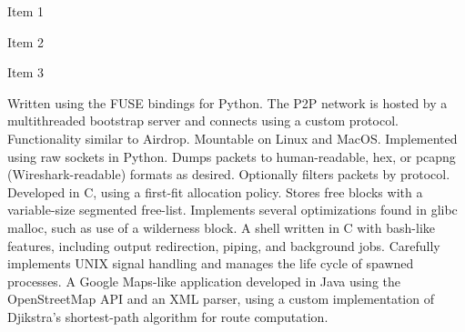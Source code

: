 \documentclass{cv}
\begin{document}
\begin{entrylist}
  {
    \item Item 1
    \item Item 2
    \item Item 3
  }

    {Written using the FUSE bindings for Python. The P2P network is hosted by a multithreaded bootstrap server and connects using a custom protocol. Functionality similar to Airdrop. Mountable on Linux and MacOS.}
    {Implemented using raw sockets in Python. Dumps packets to human-readable, hex, or pcapng (Wireshark-readable) formats as desired. Optionally filters packets by protocol.}
    {Developed in C, using a first-fit allocation policy. Stores free blocks with a variable-size segmented free-list. Implements several optimizations found in glibc malloc, such as use of a wilderness block.}
    {A shell written in C with bash-like features, including output redirection, piping, and background jobs. Carefully implements UNIX signal handling and manages the life cycle of spawned processes.}
    {A Google Maps-like application developed in Java using the OpenStreetMap API and an XML parser, using a custom implementation of Djikstra's shortest-path algorithm for route computation.}
\end{entrylist}
\end{document}
